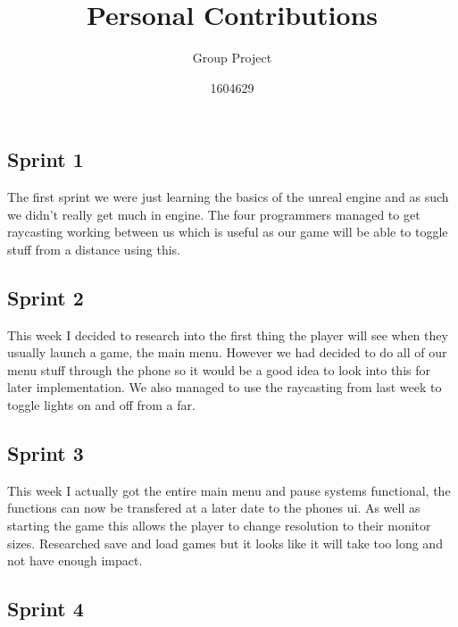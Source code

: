 \documentclass{scrartcl}
\title{Personal Contributions}
\subtitle{Group Project}
\author{1604629}
\begin{document}
\maketitle


\newpage
\clearpage

\section*{}


\subsection*{Sprint 1}

The first sprint we were just learning the basics of the unreal engine and as such we didn't really get much in engine. The four programmers managed to get raycasting working between us which is useful as our game will be able to toggle stuff from a distance using this.

\subsection*{Sprint 2}

This week I decided to research into the first thing the player will see when they usually launch a game, the main menu. However we had decided to do all of our menu stuff through the phone so it would be a good idea to look into this for later implementation. We also managed to use the raycasting from last week to toggle lights on and off from a far.

\subsection*{Sprint 3}

This week I actually got the entire main menu and pause systems functional, the functions can now be transfered at a later date to the phones ui. As well as starting the game this allows the player to change resolution to their monitor sizes. Researched save and load games but it looks like it will take too long and not have enough impact.

\subsection*{Sprint 4}
\end{document}
